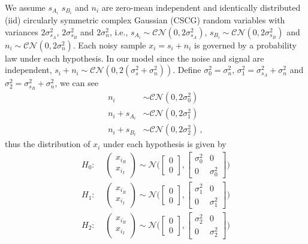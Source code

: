 We assume  $s_{A_i}$ $s_{B_i}$ and $n_i$ are zero-mean independent and identically distributed (iid) circularly symmetric complex Gaussian (CSCG) random variables with variances $2\sigma_{s_A}^2$, $2\sigma_{s_B}^2$ and $2\sigma_{n}^2$, i.e., $s_{A_i} \sim \mathcal{CN}(0, 2\sigma_{s_A}^2)$, $s_{B_i} \sim \mathcal{CN}(0, 2\sigma_{s_B}^2)$ and $n_i \sim \mathcal{CN}(0, 2\sigma_{n}^2)$.   
Each noisy sample $x_i = s_i + n_i$ is governed by a probability law under each hypothesis. In our model
since the noise and signal are independent, $s_i+ n_i \sim \mathcal{CN}(0, 2(\sigma_{s}^2 + \sigma_n^2))$.  Define $\sigma_0^2 = \sigma_n^2$, $\sigma_1^2 = \sigma_{s_A}^2 + \sigma_n^2$ and $\sigma_2^2 = \sigma_{s_B}^2 + \sigma_n^2$, we can see
\begin{equation}
  \label{1129a1}
  \begin{split}
  n_i &\sim \mathcal{CN}(0, 2\sigma_0^2)\\
  n_i + s_{A_i} &\sim \mathcal{CN}(0, 2\sigma_1^2)\\
   n_i + s_{B_i}&\sim \mathcal{CN}(0, 2\sigma_2^2) \,,
  \end{split}
\end{equation}
thus the distribution of $x_i$ under each hypothesis is given by
\begin{equation}
   \begin{split}
  H_0:\;\;\;\;\begin{pmatrix} x_{i_R} \\ x_{i_I} \end{pmatrix} \sim \mathcal{N}\Big( \begin{bmatrix} 0 \\ 0 \end{bmatrix}, \begin{bmatrix} \sigma_0^2 & 0\\ 0 & \sigma_0^2 \end{bmatrix} \Big)\\
  H_1:\;\;\;\;\begin{pmatrix} x_{i_R} \\ x_{i_I} \end{pmatrix} \sim \mathcal{N}\Big( \begin{bmatrix} 0 \\ 0 \end{bmatrix}, \begin{bmatrix} \sigma_1^2 & 0\\ 0 & \sigma_1^2 \end{bmatrix} \Big)\\
  H_2:\;\;\;\;\begin{pmatrix} x_{i_R} \\ x_{i_I} \end{pmatrix} \sim \mathcal{N}\Big( \begin{bmatrix} 0 \\ 0 \end{bmatrix}, \begin{bmatrix} \sigma_2^2 & 0\\ 0 & \sigma_2^2 \end{bmatrix} \Big)
\end{split}
  \label{equ:xdistribution}
\end{equation}
